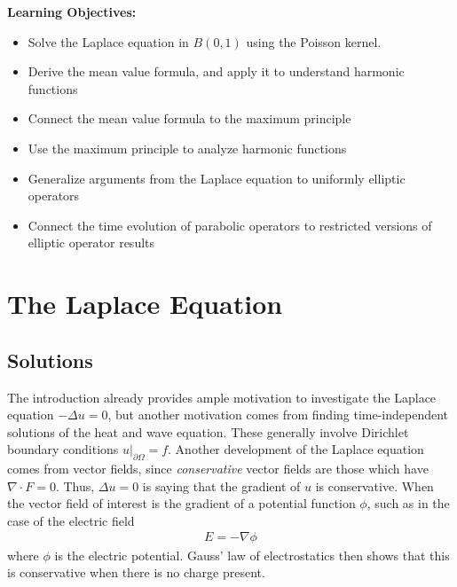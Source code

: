 \documentclass{article}
\newcommand{\pd}{\partial}
\newcounter{result}[section]
\begin{document}
	
	\textbf{Learning Objectives:}
	
	\begin{itemize}
		\item Solve the Laplace equation in $B(0,1)$ using the Poisson kernel. 
		\item Derive the mean value formula, and apply it to understand harmonic functions
		\item Connect the mean value formula to the maximum principle
		\item Use the maximum principle to analyze harmonic functions
		\item Generalize arguments from the Laplace equation to uniformly elliptic operators
		\item Connect the time evolution of parabolic operators to restricted versions of elliptic operator results
	\end{itemize}
	
	
	\section{The Laplace Equation}
	
	\subsection{Solutions}
	
	The introduction already provides ample motivation to investigate the Laplace equation $-\Delta u = 0$, but another motivation comes from finding time-independent solutions of the heat and wave equation. These generally involve Dirichlet boundary conditions $u|_{\pd \Omega} = f$. Another development of the Laplace equation comes from vector fields, since \textit{conservative} vector fields are those which have $\nabla \cdot F = 0$. Thus, $\Delta u =0$ is saying that the gradient of $u$ is conservative. When the vector field of interest is the gradient of a potential function $\phi$, such as in the case of the electric field 
	\begin{align*}
		E = -\nabla \phi 
	\end{align*}
	where $\phi$ is the electric potential. Gauss' law of electrostatics then shows that this is conservative when there is no charge present.
	
\end{document}
